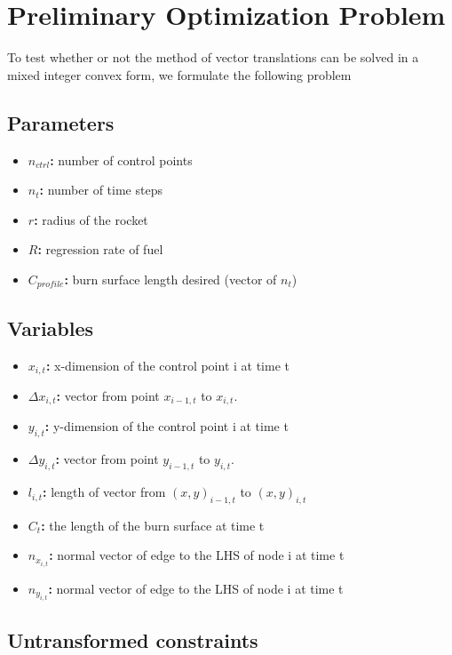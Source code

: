 \documentclass[12pt]{article}
\begin{document}
	
	\section{Preliminary Optimization Problem}
	
	To test whether or not the method of vector translations can be solved
	in a mixed integer convex form, we formulate the following problem 
	
	\subsection{Parameters}
	\begin{itemize}
	\item \textbf{$n_{ctrl}$:} number of control points
	\item \textbf{$n_t$:} number of time steps
	\item \textbf{$r$:} radius of the rocket
	\item \textbf{$R$:} regression rate of fuel
	\item \textbf{$C_{profile}$:} burn surface length desired (vector of $n_t$)
	\end{itemize}
	
	\subsection{Variables}
	\begin{itemize}
		\item \textbf{$x_{i,t}$:} x-dimension of the control point i at time t
		\item \textbf{$\Delta x_{i,t}$:} vector from point $x_{i-1,t}$ to $x_{i,t}$.
		\item \textbf{$y_{i,t}$:} y-dimension of the control point i at time t
		\item \textbf{$\Delta y_{i,t}$:} vector from point $y_{i-1,t}$ to $y_{i,t}$.
		\item \textbf{$l_{i,t}$:} length of vector from $(x,y)_{i-1,t}$ to $(x,y)_{i,t}$  
		\item \textbf{$C_{t}$:} the length of the burn surface at time t
		\item \textbf{$n_{x_{i,t}}$:} normal vector of edge to the LHS of node i at time t
		\item \textbf{$n_{y_{i,t}}$:} normal vector of edge to the LHS of node i at time t
	\end{itemize}
	
	\subsection{Untransformed constraints}
	
\end{document}
